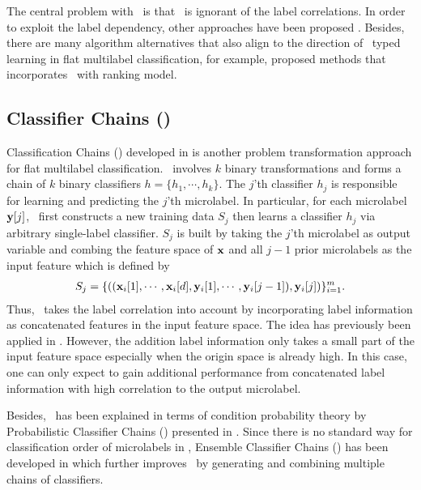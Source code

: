 {The central problem with \mlknn\ is that \mlknn\ is ignorant of the label correlations.
In order to exploit the label dependency, other approaches have been proposed \citep{Cheng09combining,Younes11a}.
Besides, there are many algorithm alternatives that also align to the direction of \knn\ typed learning in flat multilabel classification, for example, \citet{Brinker07case,Chiang12a} proposed methods that incorporates \knn\ with ranking model.


%
%
\subsection{Classifier Chains (\cc)}

Classification Chains (\cc) developed in \citep{Read09classifier,Read11classifier} is another problem transformation approach for flat multilabel classification.
\cc\ involves $k$ binary transformations and forms a chain of $k$ binary classifiers $h=\{h_1,\cdots,h_k\}$.
The $j$'th classifier $h_j$ is responsible for learning and predicting the $j$'th microlabel.
In particular, for each microlabel $\mathbf {y}[j]$, \cc\ first constructs a new training data $S_j$ then learns a classifier $h_j$ via arbitrary single-label classifier.
$S_j$ is built by taking the $j$'th microlabel as output variable and combing the feature space of $\mathbf {x}$ and all $j-1$ prior microlabels as the input feature which is defined by
\begin{align*}
	S_j = \{((\mathbf {x}_i[1],\cdots,\mathbf {x}_i[d],\mathbf {y}_i[1],\cdots,\mathbf {y}_i[j-1]),\mathbf {y}_i[j])\}_{i=1}^{m}.
\end{align*} 
Thus, \cc\ takes the label correlation into account by incorporating label information as concatenated features in the input feature space.
The idea has previously been applied in \citep{Godbole04discriminative}.
However, the addition label information only takes a small part of the input feature space especially when the origin space is already high.
In this case, one can only expect to gain additional performance from concatenated label information with high correlation to the output microlabel.

Besides, \cc\ has been explained in terms of condition probability theory by Probabilistic Classifier Chains (\pcc) presented in \citep{Read09classifier}.
Since there is no standard way for classification order of microlabels in \cc, Ensemble Classifier Chains (\ecc) has been developed in \citep{Read11classifier} which further improves \cc\ by generating and combining multiple chains of classifiers. 


}
